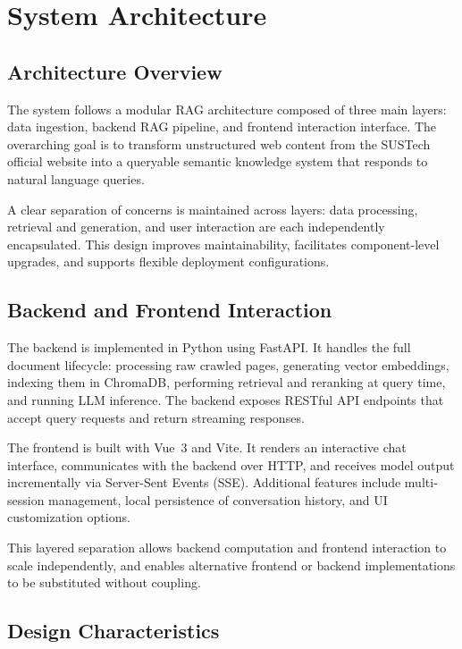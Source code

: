 \chapter{System Architecture}

\section{Architecture Overview}

The system follows a modular RAG architecture composed of three main layers: data ingestion, backend RAG pipeline, and frontend interaction interface. The overarching goal is to transform unstructured web content from the SUSTech official website into a queryable semantic knowledge system that responds to natural language queries.

A clear separation of concerns is maintained across layers: data processing, retrieval and generation, and user interaction are each independently encapsulated. This design improves maintainability, facilitates component-level upgrades, and supports flexible deployment configurations.

\section{Backend and Frontend Interaction}

The backend is implemented in Python using FastAPI. It handles the full document lifecycle: processing raw crawled pages, generating vector embeddings, indexing them in ChromaDB, performing retrieval and reranking at query time, and running LLM inference. The backend exposes RESTful API endpoints that accept query requests and return streaming responses.

The frontend is built with Vue~3 and Vite. It renders an interactive chat interface, communicates with the backend over HTTP, and receives model output incrementally via Server-Sent Events (SSE). Additional features include multi-session management, local persistence of conversation history, and UI customization options.

This layered separation allows backend computation and frontend interaction to scale independently, and enables alternative frontend or backend implementations to be substituted without coupling.

\section{Design Characteristics}

